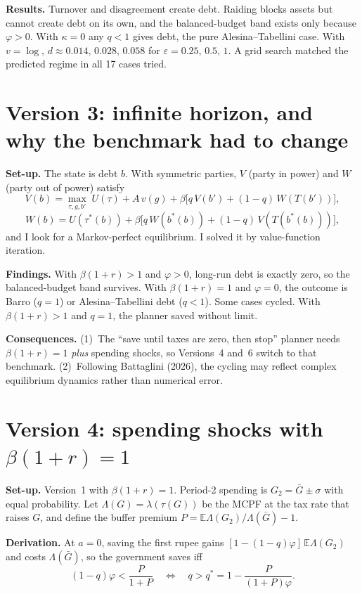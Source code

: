\documentclass[11pt]{article}
\newcommand{\E}{\mathbb{E}}
\begin{document}
\textbf{Results.} Turnover and disagreement create debt. Raiding blocks assets but cannot create debt on its own, and the balanced-budget band exists only because $\varphi>0$. With $\kappa=0$ any $q<1$ gives debt, the pure Alesina--Tabellini case. With $v=\log$, $d\approx0.014,\,0.028,\,0.058$ for $\varepsilon=0.25,\,0.5,\,1$. A grid search matched the predicted regime in all 17 cases tried.

\section{Version 3: infinite horizon, and why the benchmark had to change}

\textbf{Set-up.} The state is debt $b$. With symmetric parties, $V$ (party in power) and $W$ (party out of power) satisfy
\[
V(b)=\max_{\tau,g,b'}\;U(\tau)+A\,v(g)+\beta\big[q\,V(b')+(1-q)\,W(T(b'))\big],
\]
\[
W(b)=U(\tau^*(b))+\beta\big[q\,W(b^*(b))+(1-q)\,V(T(b^*(b)))\big],
\]
and I look for a Markov-perfect equilibrium. I solved it by value-function iteration.

\textbf{Findings.} With $\beta(1+r)>1$ and $\varphi>0$, long-run debt is exactly zero, so the balanced-budget band survives. With $\beta(1+r)=1$ and $\varphi=0$, the outcome is Barro ($q=1$) or Alesina--Tabellini debt ($q<1$). Some cases cycled. With $\beta(1+r)>1$ and $q=1$, the planner saved without limit.

\textbf{Consequences.} (1)~The ``save until taxes are zero, then stop'' planner needs $\beta(1+r)=1$ \emph{plus} spending shocks, so Versions~4 and~6 switch to that benchmark. (2)~Following Battaglini (2026), the cycling may reflect complex equilibrium dynamics rather than numerical error.

\section{Version 4: spending shocks with $\beta(1+r)=1$}

\textbf{Set-up.} Version~1 with $\beta(1+r)=1$. Period-2 spending is $G_2=\bar G\pm\sigma$ with equal probability. Let $\Lambda(G)=\lambda(\tau(G))$ be the MCPF at the tax rate that raises $G$, and define the buffer premium $P=\E\Lambda(G_2)/\Lambda(\bar G)-1$.

\textbf{Derivation.} At $a=0$, saving the first rupee gains $[1-(1-q)\varphi]\,\E\Lambda(G_2)$ and costs $\Lambda(\bar G)$, so the government saves iff
\[
(1-q)\varphi<\frac{P}{1+P}\quad\Longleftrightarrow\quad q>q^*=1-\frac{P}{(1+P)\varphi}.
\]
\end{document}
